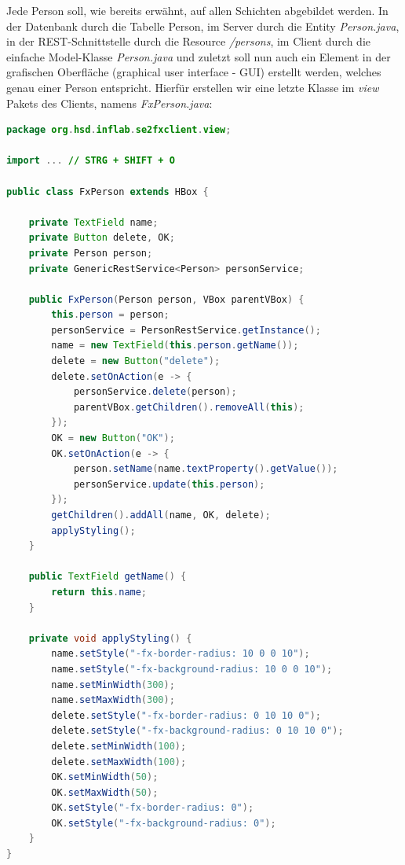 \documentclass[11pt]{scrartcl}
\begin{document}
Jede Person soll, wie bereits erwähnt, auf allen Schichten abgebildet werden.
In der Datenbank durch die Tabelle Person, im Server durch die Entity \textit{Person.java}, 
in der REST-Schnittstelle durch die Resource \textit{/persons}, im Client durch
die einfache Model-Klasse \textit{Person.java} und zuletzt soll nun auch ein
Element in der grafischen Oberfläche (graphical user interface - GUI) erstellt werden, 
welches genau einer Person entspricht.
Hierfür erstellen wir eine letzte Klasse im \textit{view} Pakets des Clients, namens 
\textit{FxPerson.java}:

\begin{lstlisting}[language=java]
package org.hsd.inflab.se2fxclient.view;

import ... // STRG + SHIFT + O

public class FxPerson extends HBox {

    private TextField name;
    private Button delete, OK;
    private Person person;
    private GenericRestService<Person> personService;

    public FxPerson(Person person, VBox parentVBox) {
        this.person = person;
        personService = PersonRestService.getInstance();
        name = new TextField(this.person.getName());
        delete = new Button("delete");
        delete.setOnAction(e -> {
            personService.delete(person);
            parentVBox.getChildren().removeAll(this);
        });
        OK = new Button("OK");
        OK.setOnAction(e -> {
            person.setName(name.textProperty().getValue());
            personService.update(this.person);
        });
        getChildren().addAll(name, OK, delete);
        applyStyling();
    }

    public TextField getName() {
        return this.name;
    }

    private void applyStyling() {
        name.setStyle("-fx-border-radius: 10 0 0 10");
        name.setStyle("-fx-background-radius: 10 0 0 10");
        name.setMinWidth(300);
        name.setMaxWidth(300);
        delete.setStyle("-fx-border-radius: 0 10 10 0");
        delete.setStyle("-fx-background-radius: 0 10 10 0");
        delete.setMinWidth(100);
        delete.setMaxWidth(100);
        OK.setMinWidth(50);
        OK.setMaxWidth(50);
        OK.setStyle("-fx-border-radius: 0");
        OK.setStyle("-fx-background-radius: 0");
    }
}
\end{lstlisting}

\newpage
\end{document}
